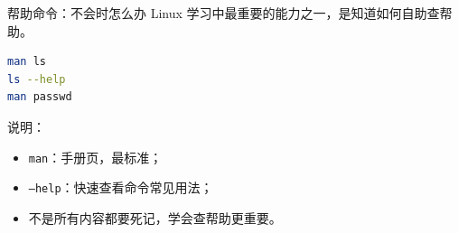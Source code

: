 \documentclass[aspectratio=169]{beamer}
\begin{document}
\begin{frame}[fragile]{帮助命令：不会时怎么办}
Linux 学习中最重要的能力之一，是知道如何自助查帮助。

\begin{lstlisting}[language=bash]
man ls
ls --help
man passwd
\end{lstlisting}

\vspace{0.5em}
说明：
\begin{itemize}
  \item \texttt{man}：手册页，最标准；
  \item \texttt{--help}：快速查看命令常见用法；
  \item 不是所有内容都要死记，学会查帮助更重要。
\end{itemize}
\end{frame}




\end{document}
